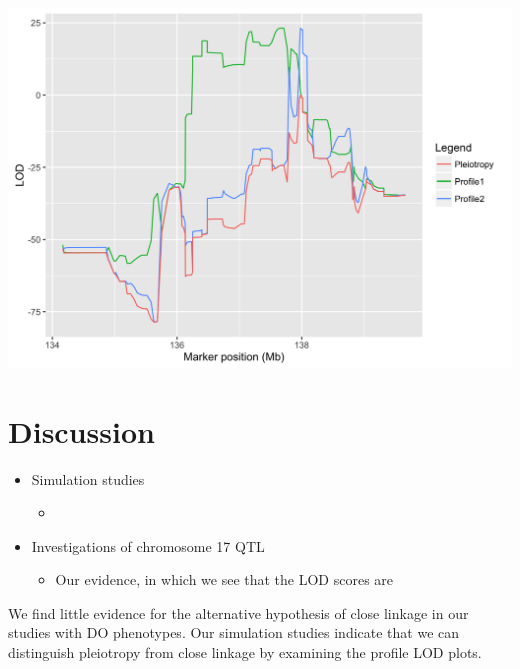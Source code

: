 \documentclass[a0,landscape]{a0poster}
\begin{document}
\begin{multicols}{4}
\begin{center}\vspace{1cm}
\includegraphics[width=0.8\linewidth]{do3.png}
\end{center}\vspace{1cm}




\section*{Discussion}

\begin{itemize}
\item Simulation studies
\begin{itemize}
\item 
\end{itemize}

\item Investigations of chromosome 17 QTL
\begin{itemize}
\item Our evidence, in which we see that the LOD scores are 
\end{itemize}

\end{itemize}
We find little evidence for the alternative hypothesis of close linkage in our studies with DO phenotypes. Our simulation studies indicate that we can distinguish pleiotropy from close linkage by examining the profile LOD plots.







\end{multicols}
\end{document}
